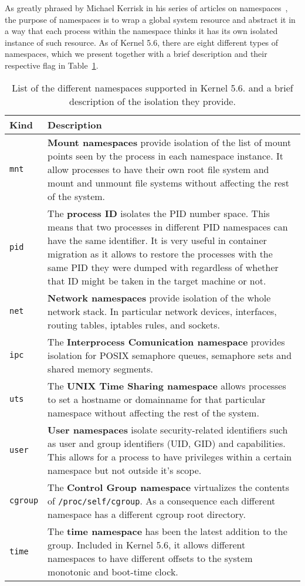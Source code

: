 As greatly phrased by Michael Kerrisk in his series of articles on namespaces~\cite{Kerrisk2013}, the purpose of namespaces is to wrap a global system resource and abstract it in a way that each process within the namespace thinks it has its own isolated instance of such resource.
As of Kernel 5.6, there are eight different types of namespaces, which we present together with a brief description and their respective flag in Table~\ref{table:namespaces}.
\begin{table}[h!]
    \centering
    \begin{tabular}{p{2cm}p{13cm}}
        \hline
        \textbf{Kind} & \textbf{Description} \\[3pt]
        \hline \hline
        \texttt{mnt} & \textbf{Mount namespaces} provide isolation of the list of mount points seen by the process in each namespace instance. It allow processes to have their own root file system and mount and unmount file systems without affecting the rest of the system. \\[3pt]
        \texttt{pid} & The \textbf{process ID} isolates the PID number space. This means that two processes in different PID namespaces can have the same identifier. It is very useful in container migration as it allows to restore the processes with the same PID they were dumped with regardless of whether that ID might be taken in the target machine or not. \\[3pt]
        \texttt{net} & \textbf{Network namespaces} provide isolation of the whole network stack. In particular network devices, interfaces, routing tables, iptables rules, and sockets. \\[3pt]
        \texttt{ipc} & The \textbf{Interprocess Comunication namespace} provides isolation for POSIX semaphore queues, semaphore sets and shared memory segments.\\[3pt]
        \texttt{uts} & The \textbf{UNIX Time Sharing namespace} allows processes to set a hostname or domainname for that particular namespace without affecting the rest of the system. \\[3pt]
        \texttt{user} & \textbf{User namespaces} isolate security-related identifiers such as user and group identifiers (UID, GID) and capabilities. This allows for a process to have privileges within a certain namespace but not outside it's scope. \\[3pt]
        \texttt{cgroup} & The \textbf{Control Group namespace} virtualizes the contents of \texttt{/proc/self/cgroup}. As a consequence each different namespace has a different cgroup root directory.\\[3pt]
        \texttt{time} & The \textbf{time namespace} has been the latest addition to the group. Included in Kernel 5.6, it allows different namespaces to have different offsets to the system monotonic and boot-time clock.\\[3pt]
        \hline
    \end{tabular}
    \caption[List of the different namespaces supported in Kernel 5.6.]{List of the different namespaces supported in Kernel 5.6. and a brief description of the isolation they provide.\label{table:namespaces}}
\end{table}
